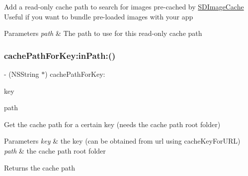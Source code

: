 Add a read-\/only cache path to search for images pre-\/cached by \mbox{\hyperlink{interface_s_d_image_cache}{S\+D\+Image\+Cache}} Useful if you want to bundle pre-\/loaded images with your app


\begin{DoxyParams}{Parameters}
{\em path} & The path to use for this read-\/only cache path \\
\hline
\end{DoxyParams}
\mbox{\label{interface_s_d_image_cache_a8dffa7933d6dcd6668331d03d29e2ad0}} 
\subsubsection{\texorpdfstring{cache\+Path\+For\+Key\+:in\+Path\+:()}{cachePathForKey:inPath:()}\hspace{0.1cm}{\footnotesize\ttfamily [1/3]}}
{\footnotesize\ttfamily -\/ (N\+S\+String $\ast$) cache\+Path\+For\+Key\+: \begin{DoxyParamCaption}\item[{(N\+S\+String $\ast$)}]{key }\item[{inPath:(N\+S\+String $\ast$)}]{path }\end{DoxyParamCaption}}

Get the cache path for a certain key (needs the cache path root folder)


\begin{DoxyParams}{Parameters}
{\em key} & the key (can be obtained from url using cache\+Key\+For\+U\+RL) \\
\hline
{\em path} & the cache path root folder\\
\hline
\end{DoxyParams}
\begin{DoxyReturn}{Returns}
the cache path 
\end{DoxyReturn}
\mbox{\label{interface_s_d_image_cache_a8dffa7933d6dcd6668331d03d29e2ad0}} 
